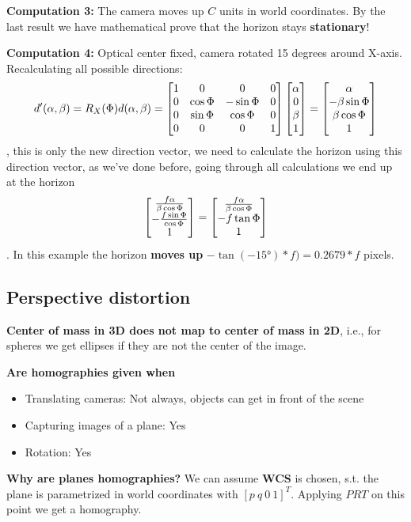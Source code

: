 \textbf{Computation 3:} The camera moves up $C$ units in world coordinates. By the last result we have mathematical prove that the horizon stays \textbf{stationary}!

\textbf{Computation 4:}  Optical center fixed, camera rotated 15 degrees around X-axis. Recalculating all possible directions: $$d'(\alpha, \beta) = R_X(\Phi)d(\alpha,\beta) = \left[\begin{matrix}1 & 0 & 0 & 0 \\ 0 & \cos \Phi & -\sin \Phi & 0 \\ 0 & \sin \Phi & \cos \Phi & 0 \\ 0 & 0 & 0 & 1\end{matrix}\right] \left[\begin{matrix}\alpha \\ 0 \\ \beta \\ 1\end{matrix}\right] = \left[\begin{matrix}\alpha \\ -\beta \sin\Phi \\ \beta \cos \Phi \\ 1\end{matrix}\right]$$, this is only the new direction vector, we need to calculate the horizon using this direction vector, as we've done before, going through all calculations we end up at the horizon $$\left[\begin{matrix}\frac{f\alpha}{\beta\cos\Phi} \\ -\frac{f\sin\Phi}{\cos\Phi} \\ 1\end{matrix}\right] = \left[\begin{matrix}\frac{f\alpha}{\beta\cos\Phi} \\ -f \tan \Phi \\ 1\end{matrix}\right]$$. In this example the horizon \textbf{moves up} $-\tan(-15°) * f) = 0.2679 * f$ pixels.

\subsection{Perspective distortion}

\textbf{Center of mass in 3D does not map to center of mass in 2D}, i.e., for spheres we get ellipses if they are not the center of the image.

\textbf{Are homographies given when} \begin{itemize}
    \item Translating cameras: Not always, objects can get in front of the scene
    \item Capturing images of a plane: Yes
    \item Rotation: Yes
\end{itemize}

\textbf{Why are planes homographies?} We can assume \textbf{WCS} is chosen, s.t. the plane is parametrized in world coordinates with $[p \ q \ 0 \ 1]^T$. Applying $PRT$ on this point we get a homography.

